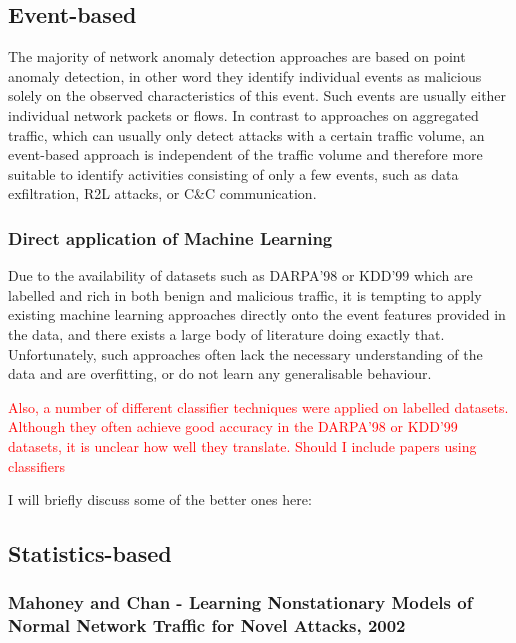 \documentclass[a4paper,12pt,twoside]{report}
\begin{document}
\subsection{Event-based}

The majority of network anomaly detection approaches are based on point anomaly detection, in other word they identify individual events as malicious solely on the observed characteristics of this event. Such events are usually either individual network packets or flows. In contrast to approaches on aggregated traffic, which can usually only detect attacks with a certain traffic volume, an event-based approach is independent of the traffic volume and therefore more suitable to identify activities consisting of only a few events, such as data exfiltration, R2L attacks, or C\&C communication.

\subsubsection{Direct application of Machine Learning}

Due to the availability of datasets such as DARPA'98 or KDD'99 which are labelled and rich in both benign and malicious traffic, it is tempting to apply existing machine learning approaches directly onto the event features provided in the data, and there exists a large body of literature doing exactly that. Unfortunately, such approaches often lack the necessary understanding of the data and are overfitting, or do not learn any generalisable behaviour. 


\textcolor{red}{ Also, a number of different classifier techniques were applied on labelled datasets. Although they often achieve good accuracy in the DARPA'98 or KDD'99 datasets, it is unclear how well they translate. Should I include papers using classifiers}


I will briefly discuss some of the better ones here:



\subsection{Statistics-based}

\subsubsection*{Mahoney and Chan - Learning Nonstationary Models of Normal Network Traffic for Novel Attacks, 2002 \cite{mahoney2002learning}}
\end{document}
